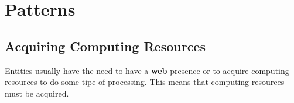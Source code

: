 \chapter{ Patterns } \label{chap:patterns}

			
			
			


	\section{Acquiring Computing Resources} \label{chap:patterns:sec:acquiringresources}
		Entities usually have the need to have a \textbf{web} presence or to acquire computing resources to do some tipe of processing. This means that computing resources must be acquired. 
		
